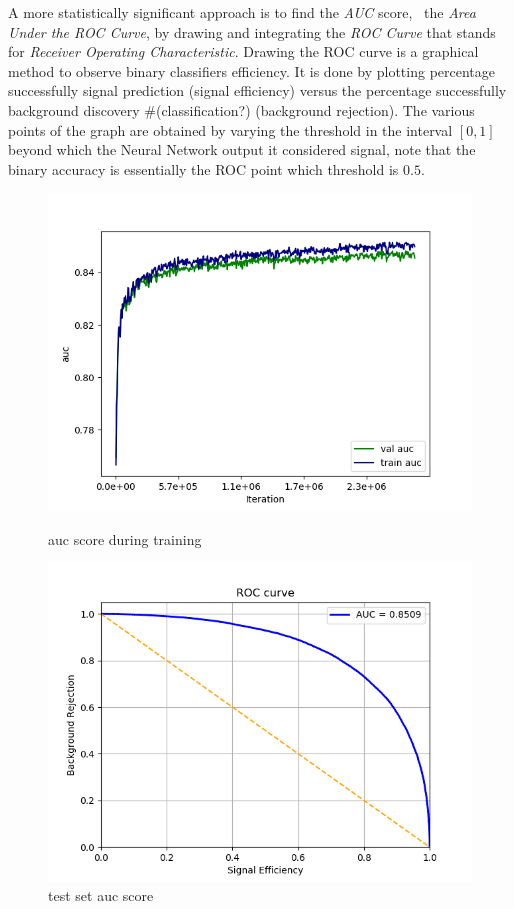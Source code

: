 A more statistically significant approach is to find the \textit{AUC}
score, \ie~the \textit{Area Under the ROC Curve}, by drawing and
integrating the \textit{ROC Curve} that stands for \textit{Receiver
 Operating Characteristic}. Drawing the ROC curve is a graphical method to
observe binary classifiers efficiency. It is done by plotting percentage
successfully signal prediction (signal efficiency) versus the percentage
successfully background discovery \#(classification?) (background rejection).
The various points of the graph are obtained by varying the threshold in
the interval $\left[0,1\right]$ beyond which the Neural Network output it
considered signal, note that the binary accuracy is essentially the
ROC point which threshold is $0.5$.
\begin{figure}[h]
 \begin{minipage}{.5\textwidth}
  \centering
  \includegraphics[scale=0.4]{figures/auc_tv.png}
  \caption{auc score during training}
 \end{minipage}\qquad%
 \begin{minipage}{.5\textwidth}
  \centering
  \includegraphics[scale=0.4]{figures/test_auc.png}
  \caption{test set auc score}
 \end{minipage}
\end{figure}

